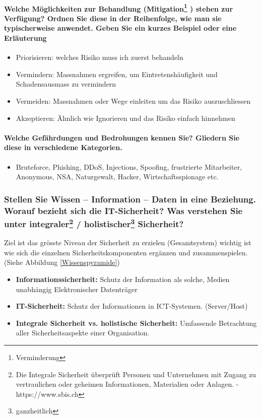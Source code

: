 \documentclass[10pt,a4paper]{article}
\begin{document}
\paragraph*{Welche Möglichkeiten zur Behandlung (\flqq Mitigation\footnote{Verminderung} \frqq) stehen zur Verfügung? Ordnen Sie diese in der Reihenfolge, wie man sie typischerweise anwendet. Geben Sie ein kurzes Beispiel oder eine Erläuterung}
\begin{itemize}[noitemsep,topsep=0pt,leftmargin=*]
    \item Priorisieren: welches Risiko muss ich zuerst behandeln
    \item Vermindern: Massnahmen ergreifen, um Eintretenshäufigkeit und Schadensausmass zu vermindern
    \item Vermeiden: Massnahmen oder Wege einleiten um das Risiko auszuschliessen
    \item Akzeptieren: Ähnlich wie Ignorieren und das Risiko einfach hinnehmen
\end{itemize}

\paragraph*{Welche Gefährdungen und Bedrohungen kennen Sie? Gliedern Sie diese in verschiedene Kategorien.}
\begin{itemize}[noitemsep,topsep=0pt,leftmargin=*]
    \item Bruteforce, Phishing, DDoS, Injections, Spoofing, frustrierte Mitarbeiter, Anonymous, NSA, Naturgewalt, Hacker, Wirtschaftsspionage etc.
\end{itemize}

\subsubsection*{Stellen Sie Wissen – Information – Daten in eine Beziehung. Worauf bezieht sich die IT-Sicherheit? Was verstehen Sie unter integraler\footnote{Die Integrale Sicherheit überprüft Personen und Unternehmen mit Zugang zu vertraulichen oder geheimen Informationen, Materialien oder Anlagen. - https://www.sbis.ch} / holistischer\footnote{ganzheitlich} Sicherheit?}
Ziel ist das grösste Niveau der Sicherheit zu erzielen (Gesamtsystem) wichtig ist wie sich die einzelnen Sicherheitskomponenten ergänzen und zusammenspielen. (Siehe Abbildung \ref{Wissenspyramide})
\begin{itemize}[noitemsep,topsep=0pt,leftmargin=*]
    \item \textbf{Informationssicherheit:} Schutz der Information als solche, Medien unabhängig Elektronischer Datenträger
    \item \textbf{IT-Sicherheit:} Schutz der Informationen in ICT-Systemen. (Server/Host)
    \item \textbf{Integrale Sicherheit vs. holistische Sicherheit:} Umfassende Betrachtung aller Sicherheitsaspekte einer Organisation.
\end{itemize}
\end{document}
